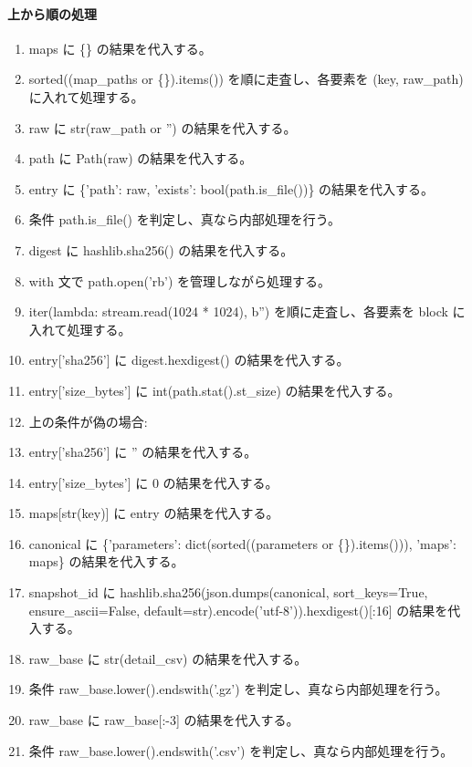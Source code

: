 \documentclass[a4paper,11pt]{article}
\begin{document}
            \paragraph{上から順の処理}
            \begin{enumerate}[leftmargin=1.8em]
            \item maps に \{\} の結果を代入する。
\item sorted((map\_paths or \{\}).items()) を順に走査し、各要素を (key, raw\_path) に入れて処理する。
\item   raw に str(raw\_path or '') の結果を代入する。
\item   path に Path(raw) の結果を代入する。
\item   entry に \{'path': raw, 'exists': bool(path.is\_file())\} の結果を代入する。
\item   条件 path.is\_file() を判定し、真なら内部処理を行う。
\item     digest に hashlib.sha256() の結果を代入する。
\item     with 文で path.open('rb') を管理しながら処理する。
\item       iter(lambda: stream.read(1024 * 1024), b'') を順に走査し、各要素を block に入れて処理する。
\item     entry['sha256'] に digest.hexdigest() の結果を代入する。
\item     entry['size\_bytes'] に int(path.stat().st\_size) の結果を代入する。
\item     上の条件が偽の場合:
\item     entry['sha256'] に '' の結果を代入する。
\item     entry['size\_bytes'] に 0 の結果を代入する。
\item   maps[str(key)] に entry の結果を代入する。
\item canonical に \{'parameters': dict(sorted((parameters or \{\}).items())), 'maps': maps\} の結果を代入する。
\item snapshot\_id に hashlib.sha256(json.dumps(canonical, sort\_keys=True, ensure\_ascii=False, default=str).encode('utf-8')).hexdigest()[:16] の結果を代入する。
\item raw\_base に str(detail\_csv) の結果を代入する。
\item 条件 raw\_base.lower().endswith('.gz') を判定し、真なら内部処理を行う。
\item   raw\_base に raw\_base[:-3] の結果を代入する。
\item 条件 raw\_base.lower().endswith('.csv') を判定し、真なら内部処理を行う。

\end{enumerate}
\end{document}
